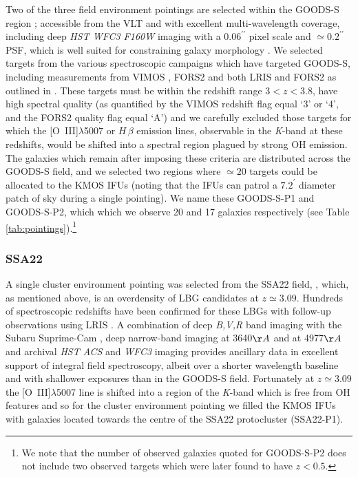 \documentclass[fleqn,usenatbib]{mnras}
\begin{document}
Two of the three field environment pointings are selected within the GOODS-S region \citep{Guo2013}; accessible from the VLT and with excellent multi-wavelength coverage, including deep {\em HST WFC3 F160W} imaging with a $0.06^{\prime\prime}$ pixel scale and $\simeq0.2^{\prime\prime}$ PSF, which is well suited for constraining galaxy morphology \citep{Grogin2011,Koekemoer2011}.
We selected targets from the various spectroscopic campaigns which have targeted GOODS-S, including measurements from VIMOS \citep{Balestra2010,Cassata2014}, FORS2 \citep{Vanzella2005,Vanzella2006,Vanzella2008} and both LRIS and FORS2 as outlined in \cite{Wuyts2009}.
These targets must be within the redshift range $3 < z < 3.8$, have high spectral quality (as quantified by the VIMOS redshift flag equal `3' or `4', and the FORS2 quality flag equal `A') and we carefully excluded those targets for which the [O~{\sc III}]$\lambda$5007 or $H\,\beta$ emission lines, observable in the {\it K}-band at these redshifts, would be shifted into a spectral region plagued by strong OH emission.
The galaxies which remain after imposing these criteria are distributed across the GOODS-S field, and we selected two regions where $\simeq20$ targets could be allocated to the KMOS IFUs (noting that the IFUs can patrol a $7.2^{\prime}$ diameter patch of sky during a single pointing).
We name these GOODS-S-P1 and GOODS-S-P2, which which we observe 20 and 17 galaxies respectively (see Table \ref{tab:pointings}).\footnote{We note that the number of observed galaxies quoted for GOODS-S-P2 does not include two observed targets which were later found to have $z < 0.5$.}

\subsubsection{SSA22}\label{subsubsec:sample_selection_ssa}
A single cluster environment pointing was selected from the SSA22 field, \citep{Steidel1998,Steidel2000,Steidel2003,Shapley2003}, which, as mentioned above, is an overdensity of LBG candidates at $z\simeq3.09$.
Hundreds of spectroscopic redshifts have been confirmed for these LBGs with follow-up observations using LRIS \citep{Shapley2003,Nestor2013}.
A combination of deep {\em B,V,R} band imaging with the Subaru Suprime-Cam \citep{Matsuda2004}, deep narrow-band imaging at 3640$\AA$ \citep{Matsuda2004} and at 4977$\AA$ \citep{Nestor2011,Yamada2012a} and archival {\em HST ACS} and {\it WFC3} imaging provides ancillary data in excellent support of integral field spectroscopy, albeit over a shorter wavelength baseline and with shallower exposures than in the GOODS-S field.
Fortunately at $z\simeq3.09$ the [O~{\sc III}]$\lambda$5007 line is shifted into a region of the {\it K}-band which is free from OH features and so for the cluster environment pointing we filled the KMOS IFUs with galaxies located towards the centre of the SSA22 protocluster (SSA22-P1).
\end{document}
